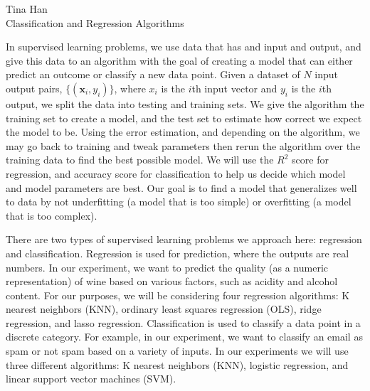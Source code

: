 \documentclass[12pt,letterpaper]{article}
\author{Tina Giagnoni}
\begin{document}
\begin{flushleft}
Tina Han\\
Classification and Regression Algorithms
\end{flushleft}

In supervised learning problems, we use data that has and input and output, and give this data to an algorithm with the goal of creating a model that can either predict an outcome or classify a new data point. Given a dataset of $N$ input output pairs, $\{(\textbf{x}_i,y_i)\}$, where $ {x}_i $ is the $i$th input vector and $ y_i $ is the $i$th output, we split the data into testing and training sets. We give the algorithm the training set to create a model, and the test set to estimate how correct we expect the model to be. Using the error estimation, and depending on the algorithm, we may go back to training and tweak parameters then rerun the algorithm over the training data to find the best possible model. We will use the $R^2$ score for regression, and accuracy score for classification to help us decide which model and model parameters are best. Our goal is to find a model that generalizes well to data by not underfitting (a model that is too simple) or overfitting (a model that is too complex). 

There are two types of supervised learning problems we approach here: regression and classification. Regression is used for prediction, where the outputs are real numbers. In our experiment, we want to predict the quality (as a numeric representation) of wine based on various factors, such as acidity and alcohol content. For our purposes, we will be considering four regression algorithms: K nearest neighbors (KNN), ordinary least squares regression (OLS), ridge regression, and lasso regression.  Classification is used to classify a data point in a discrete category. For example, in our experiment,  we want to classify an email as spam or not spam based on a variety of inputs. In our experiments we will use three different algorithms: K nearest neighbors (KNN), logistic regression, and linear support vector machines (SVM).
\end{document}
